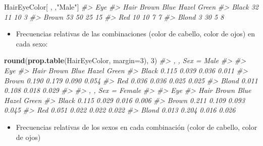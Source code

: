 \documentclass[
]{book}
\newenvironment{Shaded}{\begin{snugshade}}{\end{snugshade}}
\newcommand{\CommentTok}[1]{\textcolor[rgb]{0.56,0.35,0.01}{\textit{#1}}}
\newcommand{\DataTypeTok}[1]{\textcolor[rgb]{0.13,0.29,0.53}{#1}}
\newcommand{\DecValTok}[1]{\textcolor[rgb]{0.00,0.00,0.81}{#1}}
\newcommand{\KeywordTok}[1]{\textcolor[rgb]{0.13,0.29,0.53}{\textbf{#1}}}
\newcommand{\NormalTok}[1]{#1}
\newcommand{\StringTok}[1]{\textcolor[rgb]{0.31,0.60,0.02}{#1}}
\providecommand{\tightlist}{%
  \setlength{\itemsep}{0pt}\setlength{\parskip}{0pt}}
\theoremstyle{definition}
\theoremstyle{definition}
\theoremstyle{definition}
\theoremstyle{remark}
\begin{document}
\begin{Shaded}
\begin{Highlighting}[]
\NormalTok{HairEyeColor[ , ,}\StringTok{"Male"}\NormalTok{]}
\CommentTok{\#\textgreater{}        Eye}
\CommentTok{\#\textgreater{} Hair    Brown Blue Hazel Green}
\CommentTok{\#\textgreater{}   Black    32   11    10     3}
\CommentTok{\#\textgreater{}   Brown    53   50    25    15}
\CommentTok{\#\textgreater{}   Red      10   10     7     7}
\CommentTok{\#\textgreater{}   Blond     3   30     5     8}
\end{Highlighting}
\end{Shaded}

\begin{itemize}
\tightlist
\item
  Frecuencias relativas de las combinaciones (color de cabello, color de ojos) en cada sexo:
\end{itemize}

\begin{Shaded}
\begin{Highlighting}[]
\KeywordTok{round}\NormalTok{(}\KeywordTok{prop.table}\NormalTok{(HairEyeColor, }\DataTypeTok{margin=}\DecValTok{3}\NormalTok{), }\DecValTok{3}\NormalTok{)}
\CommentTok{\#\textgreater{} , , Sex = Male}
\CommentTok{\#\textgreater{} }
\CommentTok{\#\textgreater{}        Eye}
\CommentTok{\#\textgreater{} Hair    Brown  Blue Hazel Green}
\CommentTok{\#\textgreater{}   Black 0.115 0.039 0.036 0.011}
\CommentTok{\#\textgreater{}   Brown 0.190 0.179 0.090 0.054}
\CommentTok{\#\textgreater{}   Red   0.036 0.036 0.025 0.025}
\CommentTok{\#\textgreater{}   Blond 0.011 0.108 0.018 0.029}
\CommentTok{\#\textgreater{} }
\CommentTok{\#\textgreater{} , , Sex = Female}
\CommentTok{\#\textgreater{} }
\CommentTok{\#\textgreater{}        Eye}
\CommentTok{\#\textgreater{} Hair    Brown  Blue Hazel Green}
\CommentTok{\#\textgreater{}   Black 0.115 0.029 0.016 0.006}
\CommentTok{\#\textgreater{}   Brown 0.211 0.109 0.093 0.045}
\CommentTok{\#\textgreater{}   Red   0.051 0.022 0.022 0.022}
\CommentTok{\#\textgreater{}   Blond 0.013 0.204 0.016 0.026}
\end{Highlighting}
\end{Shaded}

\begin{itemize}
\tightlist
\item
  Frecuencias relativas de los sexos en cada combinación (color de cabello, color de ojos)
\end{itemize}
\end{document}
